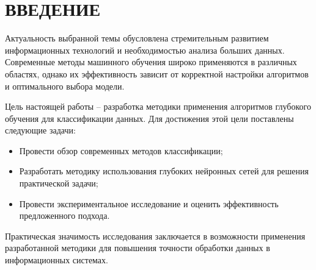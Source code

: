\chapter*{ВВЕДЕНИЕ}
\sloppy

Актуальность выбранной темы обусловлена стремительным развитием информационных технологий и необходимостью анализа больших данных. Современные методы машинного обучения широко применяются в различных областях, однако их эффективность зависит от корректной настройки алгоритмов и оптимального выбора модели.

Цель настоящей работы – разработка методики применения алгоритмов глубокого обучения для классификации данных. Для достижения этой цели поставлены следующие задачи:
\begin{itemize}
  \item Провести обзор современных методов классификации;
  \item Разработать методику использования глубоких нейронных сетей для решения практической задачи;
  \item Провести экспериментальное исследование и оценить эффективность предложенного подхода.
\end{itemize}

Практическая значимость исследования заключается в возможности применения разработанной методики для повышения точности обработки данных в информационных системах.